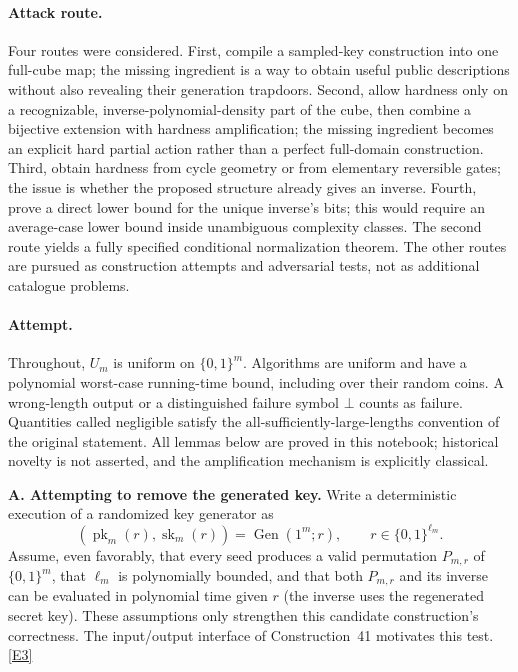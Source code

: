 \documentclass[11pt,a4paper]{article}
\newcommand{\eref}[2]{\hyperlink{extra:#1:#2}{[E#2]}}
\numberwithin{equation}{section}
\begin{document}
\paragraph{Attack route.}
Four routes were considered. First, compile a sampled-key construction
into one full-cube map; the missing ingredient is a way to obtain useful
public descriptions without also revealing their generation trapdoors.
Second, allow hardness only on a recognizable, inverse-polynomial-density
part of the cube, then combine a bijective extension with hardness
amplification; the missing ingredient becomes an explicit hard partial
action rather than a perfect full-domain construction. Third, obtain
hardness from cycle geometry or from elementary reversible gates; the
issue is whether the proposed structure already gives an inverse.
Fourth, prove a direct lower bound for the unique inverse's bits; this
would require an average-case lower bound inside unambiguous complexity
classes. The second route yields a fully specified conditional
normalization theorem. The other routes are pursued as construction
attempts and adversarial tests, not as additional catalogue problems.

\paragraph{Attempt.}
Throughout, $U_m$ is uniform on $\{0,1\}^m$. Algorithms are uniform and
have a polynomial worst-case running-time bound, including over their
random coins. A wrong-length output or a distinguished failure symbol
$\bot$ counts as failure. Quantities called negligible satisfy the
all-sufficiently-large-lengths convention of the original statement.
All lemmas below are proved in this notebook; historical novelty is not
asserted, and the amplification mechanism is explicitly classical.

\medskip{}
\textbf{A. Attempting to remove the generated key.}
Write a deterministic execution of a randomized key generator as
\[
 (\operatorname{pk}_m(r),\operatorname{sk}_m(r))
       =\operatorname{Gen}(1^m;r),\qquad r\in\{0,1\}^{\ell_m}.
\]
Assume, even favorably, that every seed produces a valid permutation
$P_{m,r}$ of $\{0,1\}^m$, that $\ell_m$ is polynomially bounded, and that
both $P_{m,r}$ and its inverse can be evaluated in polynomial time given
$r$ (the inverse uses the regenerated secret key). These assumptions
only strengthen this candidate construction's correctness.
The input/output interface of Construction~41 motivates this test.
\eref{50}{3}
\end{document}
